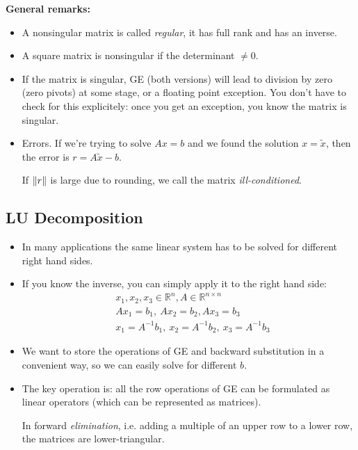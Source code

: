 \textbf{General remarks:}
\begin{itemize}
    \item {
        A nonsingular matrix is called \textit{regular}, it has full rank
        and has an inverse.
    }
    \item {
        A square matrix is nonsingular if the determinant $\ne 0$.
    }
    \item {
        If the matrix is singular, GE (both versions) will lead to division by zero
        (zero pivots) at some stage, or a floating point exception.
        You don't have to check for this explicitely: once you get an exception, 
        you know the matrix is singular.
    }
    \item {
        Errors. If we're trying to solve $Ax = b$ and we found the solution
        $x = \tilde{x}$, then the error is $r = A\tilde{x} - b$.

        If $\lVert r\rVert$ is large due to rounding, we call the matrix \textit{ill-conditioned}.
    }
\end{itemize}
\pagebreak
\subsection{LU Decomposition}
\begin{itemize}
    \item {
        In many applications the same linear system has to be solved for different right
        hand sides.
    }
    \item {
        If you know the inverse, you can simply apply it to the right hand side:
        \begin{align*}
            &
            x_1, x_2, x_3 \in \mathbb{R}^n, A \in \mathbb{R}^{n \times n}
            \\&
            Ax_1 = b_1,\ Ax_2 = b_2, Ax_3 = b_3
            \\&
            x_1 = A^{-1} b_1,\ x_2 = A^{-1} b_2,\ x_3 = A^{-1} b_3
        \end{align*}
    }
    \item {
        We want to store the operations of GE
        and backward substitution in a convenient way,
        so we can easily solve for different $b$.
    }
    \item {
        The key operation is: all the row operations
        of GE can be formulated as linear operators (which can be represented as matrices).
        
        In forward \textit{elimination}, i.e. adding a multiple of an upper row to a lower row, 
        the matrices are lower-triangular.
    }
\end{itemize}

